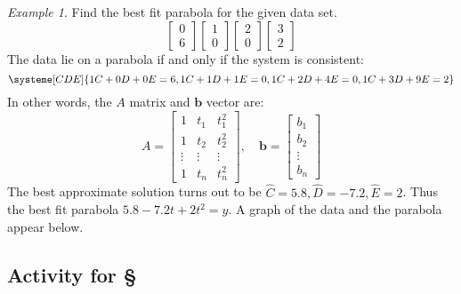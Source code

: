 \documentclass[11pt,oneside]{amsbook}
\theoremstyle{definition}
\theoremstyle{plain}
\theoremstyle{definition}
\theoremstyle{remark}
\newtheorem{example}[theorem]{Example}
\numberwithin{equation}{section}
\numberwithin{figure}{section}
\begin{document}
\begin{example}
  Find the best fit parabola for the given data set.
  \[\begin{bmatrix}0\\6\end{bmatrix}
    \begin{bmatrix}1\\0\end{bmatrix}
    \begin{bmatrix}2\\0\end{bmatrix}
    \begin{bmatrix}3\\2\end{bmatrix}
  \]
  The data lie on a parabola if and only if the system is consistent:
  \[\systeme[CDE]{1C+0D+0E=6,1C+1D+1E=0,1C+2D+4E=0,1C+3D+9E=2}
  \]
  In other words, the $A$ matrix and $\bm{b}$ vector are:
  \[A=\begin{bmatrix}
      1&t_1&t_1^2\\
      1&t_2&t_2^2\\
      \vdots&\vdots&\vdots\\
      1&t_n&t_n^2
    \end{bmatrix}
    ,\quad
    \bm{b}=\begin{bmatrix}
      b_1\\b_2\\\vdots\\b_n
    \end{bmatrix}
  \]
  The best approximate solution turns out to be $\hat C=5.8,\hat D=-7.2,\hat E=2$. Thus the best fit parabola $5.8-7.2t+2t^2=y$. A graph of the data and the parabola appear below.
  
  \begin{center}
  \end{center}
\end{example}

\newpage
\subsection*{Activity for \S \thesection}
\end{document}
